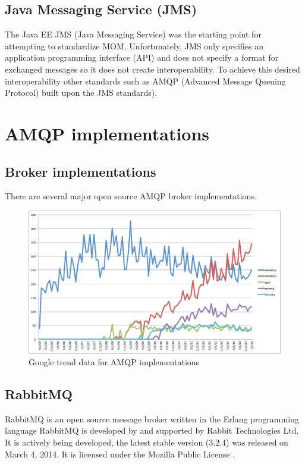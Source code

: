 \documentclass{thesis}
\begin{document}
\subsection{Java Messaging Service (JMS)}
The Java EE JMS (Java Messaging Service) was the starting point for attempting to standardize MOM. Unfortunately, JMS only specifies an application programming interface (API) and does not specify a format for exchanged messages so it does not create interoperability.   To achieve this desired interoperability other standards such as AMQP (Advanced Message Queuing Protocol) built upon the JMS standards). 

\section{AMQP implementations}

\subsection{Broker implementations}

There are several major open source AMQP broker implementations.  

\begin{figure}
\centering
\vspace{2.0in} 
\includegraphics[scale=.5]{broker_popularity}  
\caption{Google trend data for AMQP implementations}
\label{Figure 1}  
\end{figure}


\subsection{RabbitMQ}
RabbitMQ is an open source message broker written in the Erlang programming language \cite{RABBITMQ} RabbitMQ is developed by and supported by Rabbit Technologies Ltd.  It is actively being developed, the latest stable version (3.2.4) was released on March 4, 2014.  It is licensed under the Mozilla Public License \cite{rabbitmq-wikipedia}.
\end{document}
